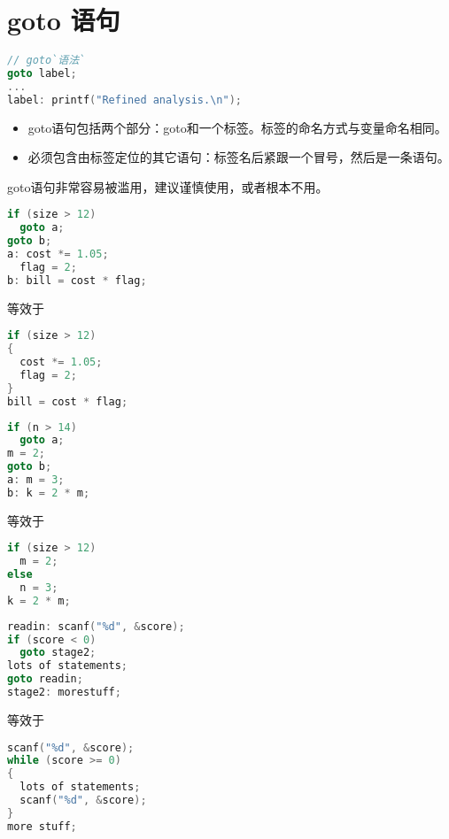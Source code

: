 \section{goto 语句}

\begin{frame}[fragile]\ft{\secname}
\begin{lstlisting}[language=c,frame=single]
// goto`语法`
goto label;
...
label: printf("Refined analysis.\n");
\end{lstlisting}

\begin{itemize}
\item
goto语句包括两个部分：goto和一个标签。标签的命名方式与变量命名相同。\\[0.1in]
\item 
必须包含由标签定位的其它语句：标签名后紧跟一个冒号，然后是一条语句。
\end{itemize}
\end{frame}

\begin{frame}[fragile]\ft{\secname}
goto语句非常容易被滥用，建议谨慎使用，或者根本不用。
\end{frame}

\begin{frame}[fragile]\ft{\secname}
\begin{lstlisting}[language=c,frame=single]
if (size > 12)
  goto a;
goto b;
a: cost *= 1.05;
  flag = 2;
b: bill = cost * flag;    
\end{lstlisting}
等效于
\begin{lstlisting}[language=c,frame=single]
if (size > 12)
{
  cost *= 1.05;
  flag = 2;
}  
bill = cost * flag;    
\end{lstlisting}
\end{frame}

\begin{frame}[fragile]\ft{\secname}
\begin{lstlisting}[language=c,frame=single]
if (n > 14)
  goto a;
m = 2;  
goto b;
a: m = 3;
b: k = 2 * m;    
\end{lstlisting}
等效于
\begin{lstlisting}[language=c,frame=single]
if (size > 12)
  m = 2;
else
  n = 3;   
k = 2 * m;    
\end{lstlisting}
\end{frame}


\begin{frame}[fragile]\ft{\secname}
\begin{lstlisting}[language=c,frame=single]
readin: scanf("%d", &score);
if (score < 0)
  goto stage2;
lots of statements;
goto readin;
stage2: morestuff;      
\end{lstlisting}
等效于
\begin{lstlisting}[language=c,frame=single]
scanf("%d", &score); 
while (score >= 0)
{
  lots of statements;
  scanf("%d", &score);
}   
more stuff;
\end{lstlisting}
\end{frame}


